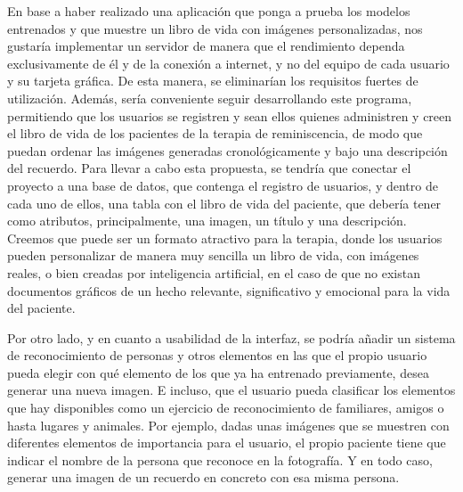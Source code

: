 En base a haber realizado una aplicación que ponga a prueba los modelos entrenados y que muestre un libro de vida con imágenes personalizadas, nos gustaría implementar un servidor de manera que el rendimiento dependa exclusivamente de él y de la conexión a internet, y no del equipo de cada usuario y su tarjeta gráfica. De esta manera, se eliminarían los requisitos fuertes de utilización. Además, sería conveniente seguir desarrollando este programa, permitiendo que los usuarios se registren y sean ellos quienes administren y creen el libro de vida de los pacientes de la terapia de reminiscencia, de modo que puedan ordenar las imágenes generadas cronológicamente y bajo una descripción del recuerdo. Para llevar a cabo esta propuesta, se tendría que conectar el proyecto a una base de datos, que contenga el registro de usuarios, y dentro de cada uno de ellos, una tabla con el libro de vida del paciente, que debería tener como atributos, principalmente, una imagen, un título y una descripción. Creemos que puede ser un formato atractivo para la terapia, donde los usuarios pueden personalizar de manera muy sencilla un libro de vida, con imágenes reales, o bien creadas por inteligencia artificial, en el caso de que no existan documentos gráficos de un hecho relevante, significativo y emocional para la vida del paciente.

Por otro lado, y en cuanto a usabilidad de la interfaz, se podría añadir un sistema de reconocimiento de personas y otros elementos en las que el propio usuario pueda elegir con qué elemento de los que ya ha entrenado previamente, desea generar una nueva imagen. E incluso, que el usuario pueda clasificar los elementos que hay disponibles como un ejercicio de reconocimiento de familiares, amigos o hasta lugares y animales. Por ejemplo, dadas unas imágenes que se muestren con diferentes elementos de importancia para el usuario, el propio paciente tiene que indicar el nombre de la persona que reconoce en la fotografía. Y en todo caso, generar una imagen de un recuerdo en concreto con esa misma persona. 


